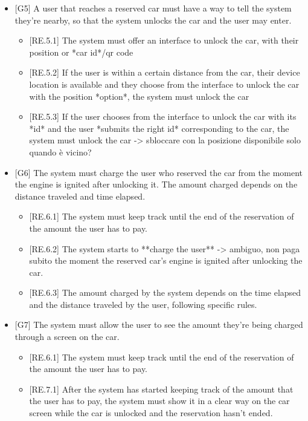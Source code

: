 \documentclass[english]{article}
\begin{document}
\begin{itemize}
{\begin{itemize}
\end{itemize}
}

\item{[G5] A user that reaches a reserved car must have a way to tell the system they’re nearby, so that the system unlocks the car and the user may enter.
\begin{itemize}
	\item{[RE.5.1] The system must offer an interface to unlock the car, with their position or *car id*/qr code}
	\item{[RE.5.2] If the user is within a certain distance from the car, their device location is available and they choose from the interface to unlock the car with the position *option*, the system must unlock the car}
	\item{[RE.5.3] If the user chooses from the interface to unlock the car with its *id* and the user *submits the right id* corresponding to the car, the system must unlock the car}
-> sbloccare con la posizione disponibile solo quando è vicino?
\end{itemize}
}

\item{[G6] The system must charge the user who reserved the car from the moment the engine is ignited after unlocking it. The amount charged depends on the distance traveled and time elapsed.
\begin{itemize}
	\item{[RE.6.1] The system must keep track until the end of the reservation of the amount the user has to pay.}
	\item{[RE.6.2] The system starts to **charge the user** -> ambiguo, non paga subito  the moment the reserved car’s engine is ignited after unlocking the car.}
	\item{[RE.6.3] The amount charged by the system depends on the time elapsed and the distance traveled by the user, following specific rules.}
\end{itemize}
}

\item{[G7] The system must allow the user to see the amount they’re being charged through a screen on the car.
\begin{itemize}
	\item{[RE.6.1] The system must keep track until the end of the reservation of the amount the user has to pay.}
	\item{[RE.7.1] After the system has started keeping track of the amount that the user has to pay, the system must show it in a clear way on the car screen while the car is unlocked and the reservation hasn’t ended.}
\end{itemize}
}


\end{itemize}
\end{document}

